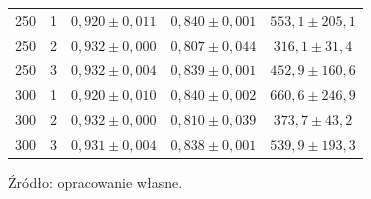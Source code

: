 \begin{table}[H]
{\begin{tabular}{llccc}
250 & 1 & $0{,}920 \pm 0{,}011$ & $0{,}840 \pm 0{,}001$ & $553{,}1 \pm 205{,}1$ \\
250 & 2 & $0{,}932 \pm 0{,}000$ & $0{,}807 \pm 0{,}044$ & $316{,}1 \pm 31{,}4$ \\
250 & 3 & $0{,}932 \pm 0{,}004$ & $0{,}839 \pm 0{,}001$ & $452{,}9 \pm 160{,}6$ \\
300 & 1 & $0{,}920 \pm 0{,}010$ & $0{,}840 \pm 0{,}002$ & $660{,}6 \pm 246{,}9$ \\
300 & 2 & $0{,}932 \pm 0{,}000$ & $0{,}810 \pm 0{,}039$ & $373{,}7 \pm 43{,}2$ \\
300 & 3 & $0{,}931 \pm 0{,}004$ & $0{,}838 \pm 0{,}001$ & $539{,}9 \pm 193{,}3$ \\
\hline
\end{tabular}}
\end{table}

Źródło: opracowanie własne.
